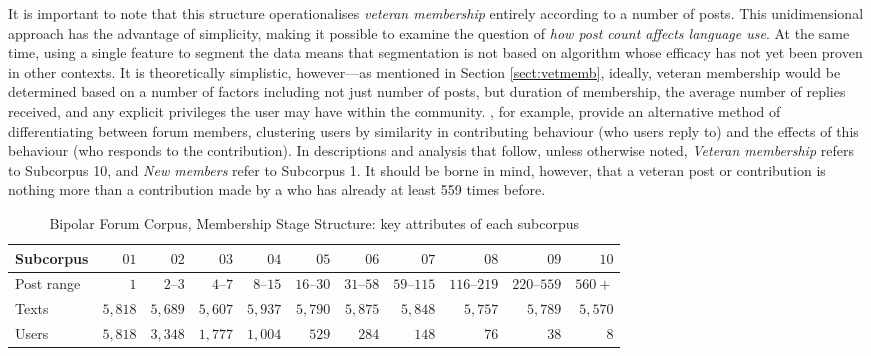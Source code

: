 It is important to note that this structure operationalises \emph{veteran membership} entirely according to a  number of \glspl{post}. This unidimensional approach has the advantage of simplicity, making it possible to examine the question of \emph{how \gls{post} count affects language use}. At the same time, using a single feature to segment the data means that segmentation is not based on algorithm whose efficacy has not yet been proven in other contexts. It is theoretically simplistic, however---as mentioned in Section \ref{sect:vetmemb}, ideally, veteran membership would be determined based on a number of factors including not just number of \glspl{post}, but duration of membership, the average number of replies received, and any explicit privileges the user may have within the community. \textcite{pfeil_social_2011}, for example, provide an alternative method of differentiating between \gls{forum} members, clustering users by similarity in contributing behaviour (who users reply to) and the effects of this behaviour (who responds to the contribution). In descriptions and analysis that follow, unless otherwise noted, \emph{Veteran membership} refers to Subcorpus 10, and \emph{New members} refer to Subcorpus 1. It should be borne in mind, however, that a veteran \gls{post} or contribution is nothing more than a contribution made by a  who has already  at least 559 times before.

\begin{table}[htb]
\centering
\footnotesize
\begin{tabularx}{1\textwidth}{Xrrrrrrrrrr}

\toprule
Subcorpus & $01$ & $02$ & $03$ & $04$ & $05$ & $06$ & $07$ & $08$ & $09$ & $10$ \\ \midrule
Post range & $1    $      &  $ 2\mbox{--}3  $   & $4\mbox{--}7 $    & $8\mbox{--}15$    & $16\mbox{--}30$ & $31\mbox{--}58$   &  $59\mbox{--}115$  & $116\mbox{--}219$ & $220\mbox{--}559$  & $560+$  \\
Texts      & $5,818$      &  $ 5,689 $   & $5,607$    & $5,937 $    & $5,790 $ & $5,875 $   &  $5,848  $  & $5,757   $ & $5,789$    & $5,570$ \\
Users     &  $5,818$      &  $ 3,348 $   & $1,777$    & $1,004$    & $ 529  $ & $284   $   &  $148    $  & $76      $ & $38$       &   $8$ \\ \bottomrule
\end{tabularx}
\caption[Membership Stage Structure: subcorpus attributes]{Bipolar Forum Corpus, Membership Stage Structure: key attributes of each subcorpus}
\label{tab:p_stats}
\end{table}


